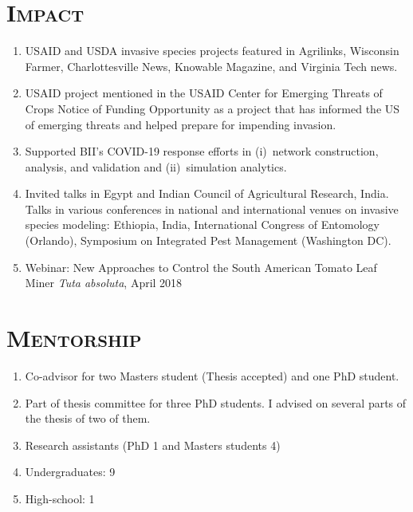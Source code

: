 \documentclass[margin,10pt]{res} %
\begin{document}
\begin{resume}
{\section{\textnormal{\textsc{Impact}}}
\begin{enumerate}[$\circ$]
\item USAID and USDA invasive species projects featured in Agrilinks,
Wisconsin Farmer, Charlottesville News, Knowable Magazine, and Virginia
Tech news.
\item USAID project mentioned in the USAID Center for Emerging Threats of
Crops Notice of Funding Opportunity as a project that has informed the US
of emerging threats and helped prepare for impending invasion.
\item Supported BII's COVID-19 response efforts in (i)~network construction,
analysis, and validation and (ii)~simulation analytics. 
\item Invited talks in Egypt and Indian Council of Agricultural Research,
India. Talks in various conferences in national and international venues on
invasive species modeling: Ethiopia, India, International Congress of
Entomology (Orlando), Symposium on Integrated Pest Management (Washington
DC).
\item Webinar: New Approaches to Control the South American Tomato Leaf
Miner \emph{Tuta absoluta}, April 2018
\end{enumerate}
}

\section{\textnormal{\textsc{Mentorship}}}
\begin{enumerate}[$\circ$]
    \item Co-advisor for two Masters student (Thesis accepted) and one PhD
    student.
    \item Part of thesis committee for three PhD students. I advised on
    several parts of the thesis of two of them.
    \item Research assistants (PhD 1 and Masters students 4)
    \item Undergraduates: 9
    \item High-school: 1
\end{enumerate}


\end{resume}
\end{document}
